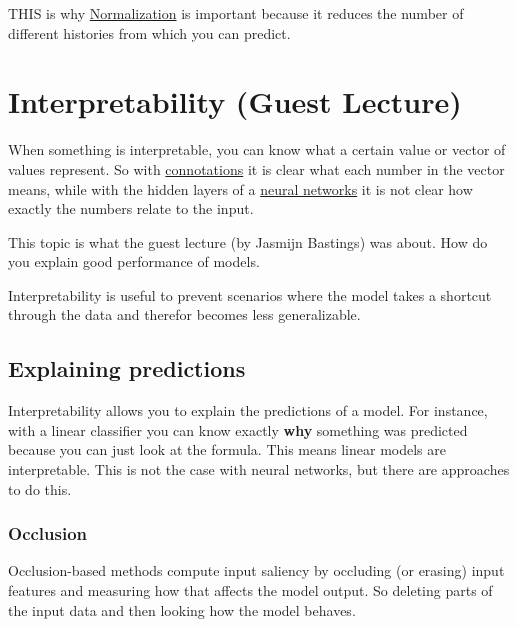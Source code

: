 \documentclass[
  11pt,
  british,
]{article}
\begin{document}
THIS is why \href{../Data/Normalization.md}{Normalization} is important
because it reduces the number of different histories from which you can
predict.

\hypertarget{interpretability-guest-lecture}{%
\section{Interpretability (Guest
Lecture)}\label{interpretability-guest-lecture}}

When something is interpretable, you can know what a certain value or
vector of values represent. So with
\href{../Semantic-Similarity/Connotations.md}{connotations} it is clear
what each number in the vector means, while with the hidden layers of a
\href{Feed\%20forward\%20neural\%20networks\%20(FFNN).md}{neural
networks} it is not clear how exactly the numbers relate to the input.

This topic is what the guest lecture (by Jasmijn Bastings) was about.
How do you explain good performance of models.

Interpretability is useful to prevent scenarios where the model takes a
shortcut through the data and therefor becomes less generalizable.

\hypertarget{explaining-predictions}{%
\subsection{Explaining predictions}\label{explaining-predictions}}

Interpretability allows you to explain the predictions of a model. For
instance, with a linear classifier you can know exactly \textbf{why}
something was predicted because you can just look at the formula. This
means linear models are interpretable. This is not the case with neural
networks, but there are approaches to do this.

\hypertarget{occlusion}{%
\subsubsection{Occlusion}\label{occlusion}}

Occlusion-based methods compute input saliency by occluding (or erasing)
input features and measuring how that affects the model output. So
deleting parts of the input data and then looking how the model behaves.
\end{document}
